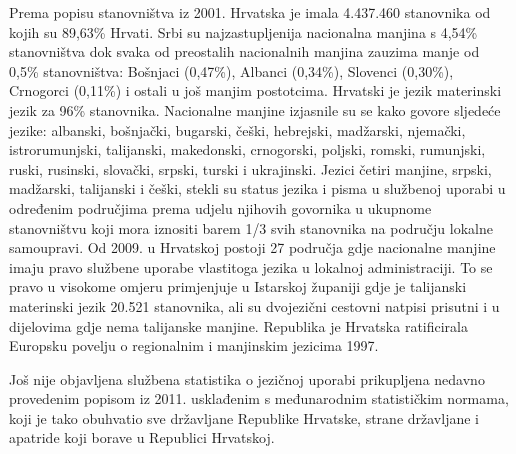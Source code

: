 \begin{multicols}{2}

Prema popisu stanovništva iz 2001. Hrvatska je imala 4.437.460 stanovnika od kojih su 89,63\% Hrvati. Srbi su najzastupljenija nacionalna manjina s 4,54\% stanovništva dok svaka od preostalih nacionalnih manjina zauzima manje od 0,5\% stanovništva: Bošnjaci (0,47\%), Albanci (0,34\%), Slovenci (0,30\%), Crnogorci (0,11\%) i ostali u još manjim postotcima. Hrvatski je jezik materinski jezik za 96\% stanovnika. Nacionalne manjine izjasnile su se kako govore sljedeće jezike: albanski, bošnjački, bugarski, češki, hebrejski, madžarski, njemački, istrorumunjski, talijanski, makedonski, crnogorski, poljski, romski, rumunjski, ruski, rusinski, slovački, srpski, turski i ukrajinski. Jezici četiri manjine, srpski, madžarski, talijanski i češki, stekli su status jezika i pisma u službenoj uporabi u određenim područjima prema udjelu njihovih govornika u ukupnome stanovništvu koji mora iznositi barem 1/3 svih stanovnika na području lokalne samoupravi. Od 2009. u Hrvatskoj postoji 27 područja gdje nacionalne manjine imaju pravo službene uporabe vlastitoga jezika u lokalnoj administraciji. To se pravo u visokome omjeru primjenjuje u Istarskoj županiji gdje je talijanski materinski jezik 20.521 stanovnika, ali su dvojezični cestovni natpisi prisutni i u dijelovima gdje nema talijanske manjine. Republika je Hrvatska ratificirala Europsku povelju o regionalnim i manjinskim jezicima 1997.

Još nije objavljena službena statistika o jezičnoj uporabi prikupljena nedavno provedenim popisom iz 2011. usklađenim s međunarodnim statističkim normama, koji je tako obuhvatio sve državljane Republike Hrvatske, strane državljane i apatride koji borave u Republici Hrvatskoj.


\end{multicols}
